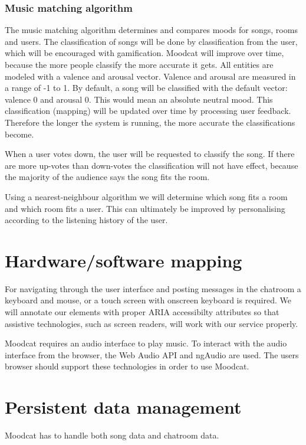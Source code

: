 \subsubsection{Music matching algorithm}\label{MatchingAlgorithm}
The music matching algorithm determines and compares moods for songs, rooms and users.
The classification of songs will be done by classification from the user, which will be encouraged with gamification.
Moodcat will improve over time, because the more people classify the more accurate it gets.
All entities are modeled with a valence and arousal vector. Valence and arousal are measured in a range of -1 to 1. By default, a song will be classified with the default vector: valence 0 and arousal 0. This would mean an absolute neutral mood. This classification (mapping) will be updated over time by processing user feedback. Therefore the longer the system is running, the more accurate the classifications become.

When a user votes down, the user will be requested to classify the song.
If there are more up-votes than down-votes the classification will not have effect, because the majority of the audience says the song fits the room.

Using a nearest-neighbour algorithm we will determine which song fits a room and which room fits a user.
This can ultimately be improved by personalising according to the listening history of the user.

\section{Hardware/software mapping}
For navigating through the user interface and posting messages in the chatroom a keyboard and mouse, or a touch screen with onscreen keyboard is required.
We will annotate our elements with proper \Gls{ARIA} accessibilty attributes so that assistive technologies, such as screen readers, will work with our service properly.

\par
Moodcat requires an audio interface to play music.
To interact with the audio interface from the browser, the Web Audio API\cite{WebAudioAPI} and ngAudio\cite{ngAudio} are used.
The users browser should support these technologies in order to use Moodcat.

\section{Persistent data management}
Moodcat has to handle both song data and chatroom data.

